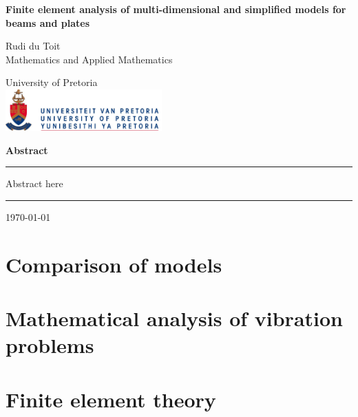 \documentclass[12pt]{report}
\begin{document}
\begin{titlepage}
  \centering
  \vspace*{0.3in}
  {\Huge\bfseries Finite element analysis of multi-dimensional and simplified models for beams and plates\par}
  \vspace{0.5in}
  {\Large Rudi du Toit\\[0.1in]}
  Mathematics and Applied Mathematics\par
  \vspace{0.5in}
  {\Large University of Pretoria\\
    \includegraphics[width=6cm]{images/logo-up.jpg}\par}
  \vspace{0.5in}
  {\LARGE\bfseries Abstract\par}
  \vspace{0.1in}
  \hrule
  \vspace{0.1in}
  \begin{minipage}{0.9\textwidth}
    Abstract here
  \end{minipage}
  \vspace{0.1in}
  \hrule
  \vfill
  \today
\end{titlepage}



\tableofcontents

\chapter{Comparison of models}\label{ch:comparison-of-models}







\chapter{Mathematical analysis of vibration problems}\label{ch:mathematical-analysis-of-vibration-problems}


\chapter{Finite element theory}\label{ch:finite-element-theory}


\end{document}
